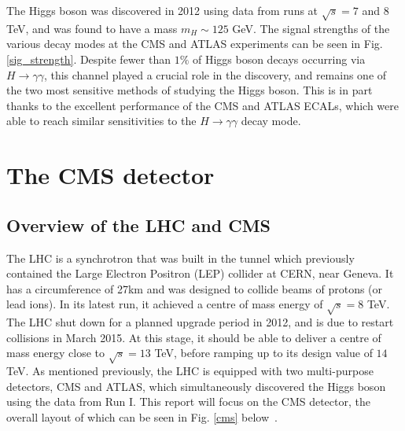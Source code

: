 \documentclass[10pt]{article}
\begin{document}
The Higgs boson was discovered in 2012 using data from runs at $\sqrt{s}=7$ and $8$ TeV, and was found to have a mass $m_H \sim 125$ GeV. The signal strengths of the various decay modes at the CMS and ATLAS experiments can be seen in Fig. \ref{sig_strength}. Despite fewer than $1\%$ of Higgs boson decays occurring via $H \rightarrow \gamma \gamma$, this channel played a crucial role in the discovery, and remains one of the two most sensitive methods of studying the Higgs boson. This is in part thanks to the excellent performance of the CMS and ATLAS ECALs, which were able to reach similar sensitivities to the $H\rightarrow \gamma \gamma$ decay mode.



\section{The CMS detector}

\subsection{Overview of the LHC and CMS}
The LHC is a synchrotron that was built in the tunnel which previously contained the Large Electron Positron (LEP) collider at CERN, near Geneva. It has a circumference of 27km and was designed to collide beams of protons (or lead ions). In its latest run, it achieved a centre of mass energy of $\sqrt{s}=8$ TeV. The LHC shut down for a planned upgrade period in 2012, and is due to restart collisions in March 2015. At this stage, it should be able to deliver a centre of mass energy close to $\sqrt{s}=13$ TeV, before ramping up to its design value of $14$ TeV. 
As mentioned previously, the LHC is equipped with two multi-purpose detectors, CMS and ATLAS, which simultaneously discovered the Higgs boson using the data from Run I. This report will focus on the CMS detector, the overall layout of which can be seen in Fig. \ref{cms} below~\cite{CMSTDR}.
\end{document}

